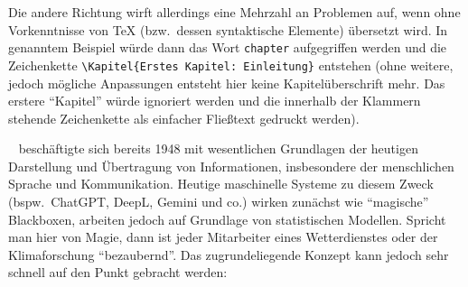 Die andere Richtung wirft allerdings eine Mehrzahl an Problemen auf, wenn ohne Vorkenntnisse von \TeX{} (bzw.\ dessen syntaktische Elemente) übersetzt wird. In genanntem Beispiel würde dann das Wort \texttt{chapter} aufgegriffen werden und die Zeichenkette \verb|\Kapitel{Erstes Kapitel: Einleitung}| entstehen (ohne weitere, jedoch mögliche Anpassungen entsteht hier keine Kapitelüberschrift mehr. Das erstere \enquote{Kapitel} würde ignoriert werden und die innerhalb der Klammern stehende Zeichenkette als einfacher Fließtext gedruckt werden). 

~\cite{bellSystemTechnicalJournal:claudeShannon1948:mathematicalTheoryOfCommunication} beschäftigte sich bereits 1948 mit wesentlichen Grundlagen der heutigen Darstellung und Übertragung von Informationen, insbesondere der menschlichen Sprache und Kommunikation. Heutige maschinelle Systeme zu diesem Zweck (bspw.\ ChatGPT, DeepL, Gemini und co.) wirken zunächst wie \enquote{magische} Blackboxen, arbeiten jedoch auf Grundlage von statistischen Modellen. Spricht man hier von Magie, dann ist jeder Mitarbeiter eines Wetterdienstes oder der Klimaforschung \enquote{bezaubernd}. Das zugrundeliegende Konzept kann jedoch sehr schnell auf den Punkt gebracht werden:\ 

